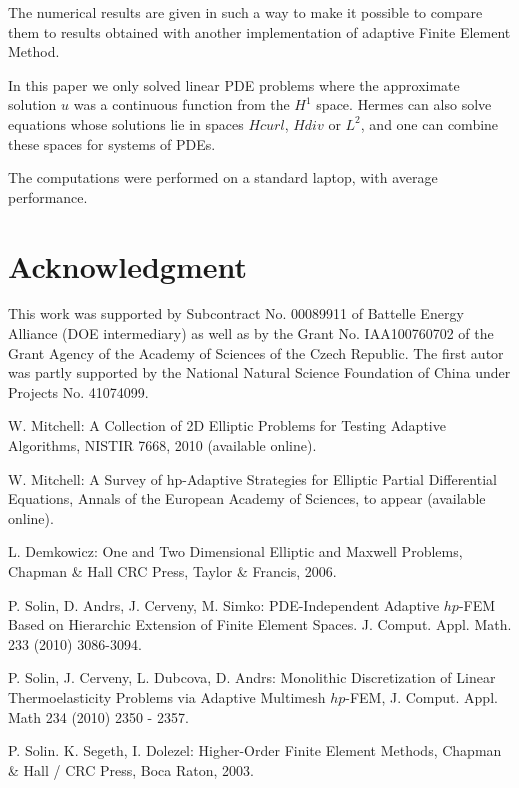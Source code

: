 \documentclass[12pt]{elsarticle}
\begin{document}
The numerical results are given in such a way to make it possible to compare them to results obtained with another implementation of adaptive Finite Element Method.

In this paper we only solved linear PDE problems where the approximate solution $u$ was a continuous function from the $H^1$ space.
Hermes can also solve equations whose solutions lie in spaces
$Hcurl$, $Hdiv$ or $L^2$, and one can combine these spaces for systems of PDEs.

The computations were performed on a standard laptop, with average performance.

\section{Acknowledgment}

This work was supported by Subcontract No. 00089911 of Battelle
Energy Alliance (DOE intermediary) as well as by the
Grant No. IAA100760702 of the Grant Agency of the Academy
of Sciences of the Czech Republic. The first autor was partly
supported by the National Natural Science Foundation
of China under Projects No. 41074099.



\begin{thebibliography}{[KLR73]}

W. Mitchell: A Collection of 2D Elliptic Problems for
Testing Adaptive Algorithms, NISTIR 7668, 2010 (available online).

W. Mitchell: A Survey of hp-Adaptive Strategies for Elliptic Partial Differential Equations,
Annals of the European Academy of Sciences, to appear (available online).

L. Demkowicz: One and Two Dimensional Elliptic and Maxwell Problems,
Chapman \& Hall \/ CRC Press, Taylor \& Francis, 2006.


P. Solin, D. Andrs, J. Cerveny, M. Simko:
PDE-Independent Adaptive $hp$-FEM Based on Hierarchic Extension of Finite Element Spaces.
J. Comput. Appl. Math. 233 (2010) 3086-3094.

P. Solin, J. Cerveny, L. Dubcova, D. Andrs:
Monolithic Discretization of Linear Thermoelasticity Problems
via Adaptive Multimesh $hp$-FEM, J. Comput. Appl. Math 234 (2010) 2350 - 2357.

P. Solin. K. Segeth, I. Dolezel: Higher-Order Finite Element Methods, Chapman \& Hall
/ CRC Press, Boca Raton, 2003.
\end{thebibliography}
\end{document}
